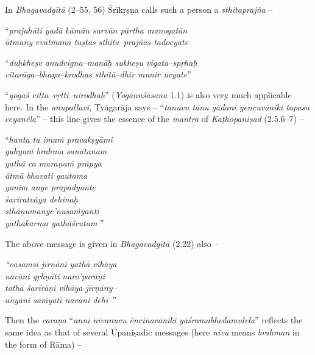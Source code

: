 In \textit{Bhagavadgītā} (2–55, 56) Śrīkṛṣṇa calls such a person a \textit{sthitaprajña} –

\begin{myquote}
“\textit{prajahāti yadā kāmān sarvān pārtha manogatān }\\\textit{ātmany evātmanā tuṣṭas sthita–prajñas tadocyate} 
\end{myquote}

\begin{myquote}
“\textit{duḥkheṣv anudvigna–manāḥ sukheṣu vigata–spṛhaḥ }\\\textit{vītarāga–bhaya–krodhas sthitā–dhīr munir ucyate}”  
\end{myquote}

“\textit{yogaś citta–vṛtti–nirodhaḥ}” (\textit{Yogānuśāsana} 1.1) is also very much applicable here. In the \textit{anupallavi}, Tyāgarāja says – “\textit{tanuvu tānu gādani yencuvāniki tapasu ceyanêla}” – this line gives the essence of the \textit{mantra} of \textit{Kaṭhopaniṣad} (2.5.6–7) –

\begin{myquote}
“\textit{hanta ta imaṁ pravakṣyāmi}\\\textit{guhyaṁ brahma sanātanam }\\\textit{yathā ca maraṇaṁ prāpya}\\\textit{ātmā bhavati gautama }\\\textit{yonim anye prapadyante}\\\textit{śarīratvāya dehinaḥ }\\\textit{sthāṇumanye’nusaṁyanti}\\\textit{yathākarma yathāśrutam} ”
\end{myquote}

The above message is given in \textit{Bhagavadgītā} (2.22) also –

\begin{myquote}
\textit{“vāsāmsi jīrṇāni yathā vihāya}\\\textit{navāni gṛhṇāti naro’parāṇi }\\\textit{tathā śarīrāṇi vihāya jīrṇāny–}\\\textit{anyāni saṁyāti navāni dehī ”}
\end{myquote}

Then the \textit{caraṇa} “\textit{anni nīvanucu êncinavāniki yāśramabhedamulela}” reflects the same idea as that of several Upaniṣadic messages (here \textit{nīvu} means \textit{brahman} in the form of Rāma) –

